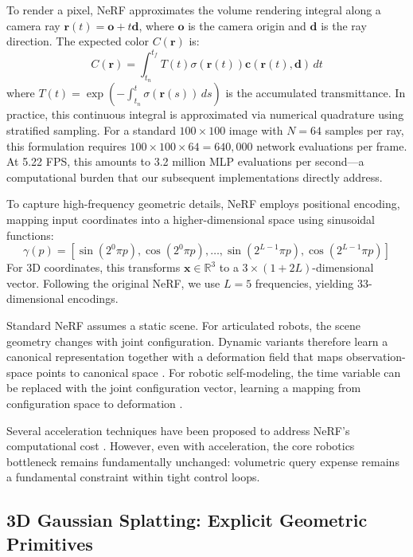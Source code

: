 \documentclass[12pt,a4paper,oneside]{report}
\begin{document}
To render a pixel, NeRF approximates the volume rendering integral along a camera ray $\mathbf{r}(t) = \mathbf{o} + t\mathbf{d}$, where $\mathbf{o}$ is the camera origin and $\mathbf{d}$ is the ray direction. The expected color $C(\mathbf{r})$ is:
\begin{equation}
C(\mathbf{r}) = \int_{t_n}^{t_f} T(t) \sigma(\mathbf{r}(t)) \mathbf{c}(\mathbf{r}(t), \mathbf{d}) \, dt
\end{equation}
where $T(t) = \exp\left(-\int_{t_n}^{t} \sigma(\mathbf{r}(s)) \, ds\right)$ is the accumulated transmittance. In practice, this continuous integral is approximated via numerical quadrature using stratified sampling. For a standard $100 \times 100$ image with $N = 64$ samples per ray, this formulation requires $100 \times 100 \times 64 = 640,000$ network evaluations per frame. At 5.22 FPS, this amounts to 3.2 million MLP evaluations per second---a computational burden that our subsequent implementations directly address.

To capture high-frequency geometric details, NeRF employs positional encoding, mapping input coordinates into a higher-dimensional space using sinusoidal functions:
\begin{equation}
\gamma(p) = [\sin(2^0 \pi p), \cos(2^0 \pi p), \ldots, \sin(2^{L-1} \pi p), \cos(2^{L-1} \pi p)]
\end{equation}
For 3D coordinates, this transforms $\mathbf{x} \in \mathbb{R}^3$ to a $3 \times (1 + 2L)$-dimensional vector. Following the original NeRF, we use $L = 5$ frequencies, yielding 33-dimensional encodings.

Standard NeRF assumes a static scene. For articulated robots, the scene geometry changes with joint configuration. Dynamic variants therefore learn a canonical representation together with a deformation field that maps observation-space points to canonical space \cite{pumarola2021d, park2021nerfies}. For robotic self-modeling, the time variable can be replaced with the joint configuration vector, learning a mapping from configuration space to deformation \cite{hu2024teaching}.

Several acceleration techniques have been proposed to address NeRF's computational cost \cite{muller2022instant, barron2021mip, barron2023zipnerf}. However, even with acceleration, the core robotics bottleneck remains fundamentally unchanged: volumetric query expense remains a fundamental constraint within tight control loops.

\subsection{3D Gaussian Splatting: Explicit Geometric Primitives}
\end{document}
